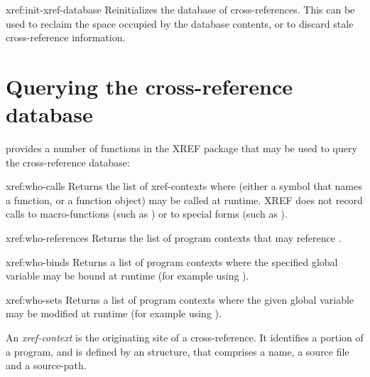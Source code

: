 \begin{defun}{xref:}{init-xref-database}{}
  Reinitializes the database of cross-references. This can be used to
  reclaim the space occupied by the database contents, or to discard
  stale cross-reference information.
\end{defun}



\section{Querying the cross-reference database}

\cmucl{} provides a number of functions in the XREF package that may
be used to query the cross-reference database:

\begin{defun}{xref:}{who-calls}{\args {}}
   Returns the list of xref-contexts where  (either a
   symbol that names a function, or a function object) may be called
   at runtime. XREF does not record calls to macro-functions (such as
   ) or to special forms (such as ).
\end{defun}

\begin{defun}{xref:}{who-references}{\args {}}
   Returns the list of program contexts that may reference
   . 
\end{defun}

\begin{defun}{xref:}{who-binds}{\args {}}
  Returns a list of program contexts where the specified global
  variable may be bound at runtime (for example using ).
\end{defun}

\begin{defun}{xref:}{who-sets}{\args {}}
  Returns a list of program contexts where the given global variable
  may be modified at runtime (for example using ). 
\end{defun}

An \textit{xref-context} is the originating site of a cross-reference.
It identifies a portion of a program, and is defined by an
 structure, that comprises a name, a source file and a
source-path. 

